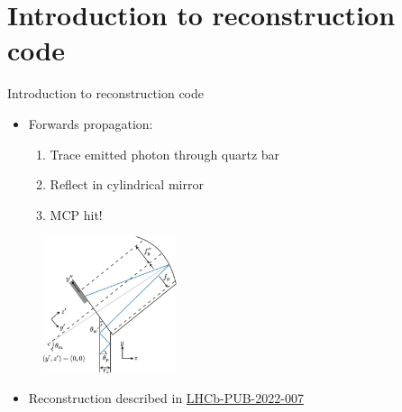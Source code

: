 \documentclass{beamer}
\begin{document}
\section{Introduction to reconstruction code}
\begin{frame}{Introduction to reconstruction code}
  \begin{itemize}
    \item{Forwards propagation:}
    \begin{enumerate}
      \item{Trace emitted photon through quartz bar}
      \item{Reflect in cylindrical mirror}
      \item{MCP hit!}
    \end{enumerate}
  \end{itemize}
  \begin{figure}
    \includegraphics[width = 0.35\textwidth]{Plots/torch-geometry.pdf}
  \end{figure}
  \begin{itemize}
    \item{Reconstruction described in \href{https://www.overleaf.com/project/5d0b9c5a5005405666aacd05}{LHCb-PUB-2022-007}}
  \end{itemize}
\end{frame}
\end{document}
